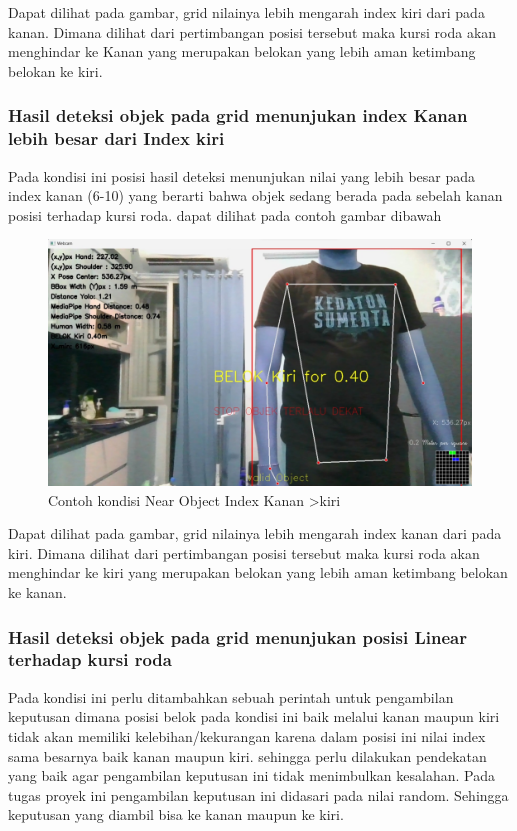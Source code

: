 Dapat dilihat pada gambar, grid nilainya lebih mengarah index kiri dari pada kanan. Dimana dilihat dari pertimbangan posisi tersebut maka kursi roda akan menghindar ke Kanan yang merupakan belokan yang lebih aman ketimbang belokan ke kiri.

\subsubsection*{Hasil deteksi objek pada grid menunjukan index Kanan lebih besar dari Index kiri}
Pada kondisi ini posisi hasil deteksi menunjukan nilai yang lebih besar pada index kanan (6-10) yang berarti bahwa objek sedang berada pada sebelah kanan posisi terhadap kursi roda. dapat dilihat pada contoh gambar dibawah

\begin{figure}[H]
    \centering
    \includegraphics[scale=0.3]{gambar/merahkanan.jpg}
    \caption{Contoh kondisi Near Object Index Kanan \textgreater kiri}
    \label{fig:Near Object index kanan>kiri}
\end{figure}

Dapat dilihat pada gambar, grid nilainya lebih mengarah index kanan dari pada kiri. Dimana dilihat dari pertimbangan posisi tersebut maka kursi roda akan menghindar ke kiri yang merupakan belokan yang lebih aman ketimbang belokan ke kanan.

\subsubsection*{Hasil deteksi objek pada grid menunjukan posisi Linear terhadap kursi roda}
Pada kondisi ini perlu ditambahkan sebuah perintah untuk pengambilan keputusan dimana posisi belok pada kondisi ini baik melalui kanan maupun kiri tidak akan memiliki kelebihan/kekurangan karena dalam posisi ini nilai index sama besarnya baik kanan maupun kiri. sehingga perlu dilakukan pendekatan yang baik agar pengambilan keputusan ini tidak menimbulkan kesalahan. Pada tugas proyek ini pengambilan keputusan ini didasari pada nilai random. Sehingga keputusan yang diambil bisa ke kanan maupun ke kiri. 

